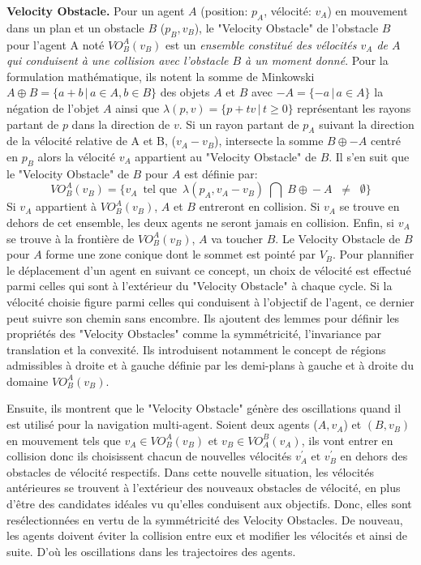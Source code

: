 \documentclass[11pt]{article}
\begin{document}
\textbf{Velocity Obstacle.} Pour un agent $A$ (position: $p_A$, vélocité: $v_A$) en mouvement dans un plan et un obstacle $B$ ($p_B, v_B$), le "Velocity Obstacle" de l'obstacle $B$ pour l'agent A noté \textbf{$VO_B^A(v_B)$} est un \textit{ensemble constitué des vélocités $v_A$ de $A$ qui conduisent à une collision avec l'obstacle $B$ à un moment donné}. Pour la formulation mathématique, ils notent la somme de Minkowski $A \oplus B = \{a+b \,|\, a \in A, b \in B\}$ des objets $A$ et $B$ avec $-A = \{-a \,|\, a \in A \}$ la négation de l'objet $A$ ainsi que $\lambda(p,v) = \{ p + tv \,|\, t \geq 0 \}$ représentant les rayons partant de $p$ dans la direction de $v$. Si un rayon partant de $p_A$ suivant la direction de la vélocité relative de A et B, ($v_A - v_B$), intersecte la somme $B \oplus -A$ centré en $p_B$ alors la vélocité $v_A$ appartient au "Velocity Obstacle" de $B$. Il s'en suit que le "Velocity Obstacle" de $B$ pour $A$ est définie par: 
\[
VO_B^A(v_B) = \{ v_A \,\mbox{ tel que }\, \lambda(p_A, v_A - v_B)\; \bigcap \; B \oplus\! -A \; \; \neq\; \;  \emptyset \}
\] 
Si $v_A$ appartient à $VO_B^A(v_B)$, $A$ et $B$ entreront en collision. Si $v_A$ se trouve en dehors de cet ensemble,  les deux agents ne seront jamais en collision. Enfin, si $v_A$ se trouve à la frontière de $VO_B^A(v_B)$, $A$ va toucher $B$. Le Velocity Obstacle de $B$ pour $A$ forme une zone conique dont le sommet est pointé par $V_B$. Pour plannifier le déplacement d'un agent en suivant ce concept, un choix de vélocité est effectué parmi celles qui sont à l'extérieur du "Velocity Obstacle" à chaque cycle. Si la vélocité choisie figure parmi celles qui conduisent à l'objectif de l'agent, ce dernier peut suivre son chemin sans encombre. Ils ajoutent des lemmes pour définir les propriétés des "Velocity Obstacles" comme la symmétricité, l'invariance par translation et la convexité. Ils introduisent notamment le concept de régions admissibles à droite et à gauche définie par les demi-plans à gauche et à droite du domaine $VO_B^A(v_B)$.

Ensuite, ils montrent que le "Velocity Obstacle" génère des oscillations quand il est utilisé pour la navigation multi-agent. Soient deux agents ($A, v_A$)  et $(B, v_B)$ en mouvement tels que $v_A \in VO_B^A(v_B)$ et $v_B \in VO_A^B(v_A)$, ils vont entrer en collision donc ils choisissent chacun de nouvelles vélocités $v_A^\prime \mbox{ et } v_B^\prime$ en dehors des obstacles de vélocité respectifs. Dans cette nouvelle situation, les vélocités antérieures se trouvent à l'extérieur des nouveaux obstacles de vélocité, en plus d'être des candidates idéales vu qu'elles conduisent aux objectifs. Donc, elles sont resélectionnées en vertu de la symmétricité des Velocity Obstacles. De nouveau, les agents doivent éviter la collision entre eux et modifier les vélocités et ainsi de suite. D'où les oscillations dans les trajectoires des agents.
\end{document}
